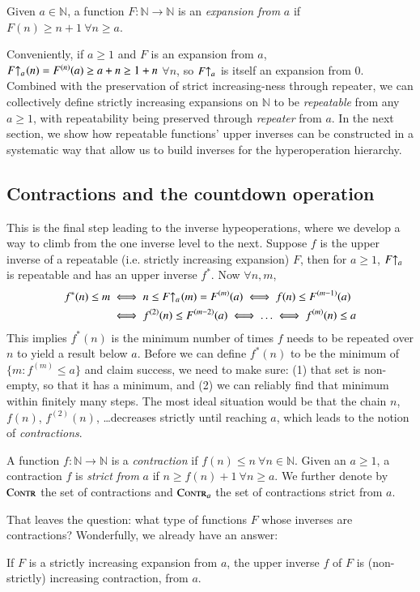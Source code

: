 \begin{defn}
Given $a\in \mathbb{N}$, a function $F:\mathbb{N}\to\mathbb{N}$ is an \emph{expansion from} $a$ if $F(n)\ge n+1 \ \forall n\ge a$.
\end{defn}
Conveniently, if $a\ge 1$ and $F$ is an expansion from $a$, $\rf{F}{a}(n) = F^{(n)}(a) \ge a + n \ge 1 + n$ $\forall n$, so $\rf{F}{a}\ $ is itself an expansion from $0$. Combined with the preservation of strict increasing-ness through repeater, we can collectively define strictly increasing expansions on $\mathbb{N}$ to be \emph{repeatable} from any $a\ge 1$, with repeatability being preserved through \emph{repeater} from $a$. In the next section, we show how repeatable functions' upper inverses can be constructed in a systematic way that allow us to build inverses for the hyperoperation hierarchy.

\subsection{Contractions and the countdown operation}

This is the final step leading to the inverse hypeoperations, where we develop a way to climb from the one inverse level to the next. Suppose $f$ is the upper inverse of a repeatable (i.e. strictly increasing expansion) $F$, then for $a\ge 1$, $\rf{F}{a}\ $ is repeatable and has an upper inverse $f^*$. Now $\forall n, m$,
$$\begin{aligned}
 f^*(n)\le m & \iff n\le \rf{F}{a}(m) = F^{(m)}(a) \iff f(n)\le F^{(m-1)}(a) \\
 & \iff f^{(2)}(n)\le F^{(m-2)}(a) \iff \ldots \iff f^{(m)}(n)\le a
\end{aligned} $$
This implies $f^*(n)$ is the minimum number of times $f$ needs to be repeated over $n$ to yield a result below $a$. Before we can define $f^*(n)$ to be the minimum of $\{m: f^{(m)}\le a \}$ and claim success, we need to make sure: (1) that set is non-empty, so that it has a minimum, and (2) we can reliably find that minimum within finitely many steps. The most ideal situation would be that the chain $n$, $f(n)$, $f^{(2)}(n)$, \ldots decreases strictly until reaching $a$, which leads to the notion of \emph{contractions}.
\begin{defn} \label{defn: contracting}
A function $f : \mathbb{N} \to \mathbb{N}$ is a \textit{contraction} if $f(n) \le n \ \forall n\in \mathbb{N}$. Given an $a \ge 1$, a contraction $f$ is \textit{strict from} $a$ if $n\ge f(n)+1 \ \forall n\ge a$. We further denote by $\text{\scshape{Contr}}$ the set of contractions and $\text{\scshape{Contr}}_a$ the set of contractions strict from $a$.
\end{defn}
That leaves the question: what type of functions $F$ whose inverses are contractions? Wonderfully, we already have an answer:
\begin{thm}
If $F$ is a strictly increasing expansion from $a$, the upper inverse $f$ of $F$ is (non-strictly) increasing contraction,  from $a$.
\end{thm}


